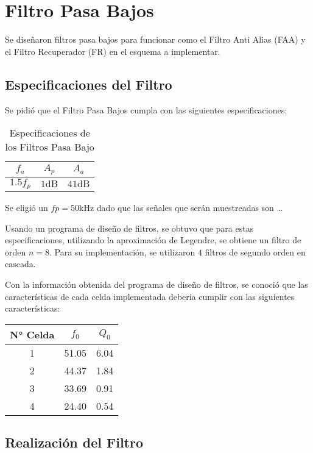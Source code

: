\chapter{Filtro Pasa Bajos}
Se diseñaron filtros pasa bajos para funcionar como el Filtro Anti Alias (FAA) y el Filtro Recuperador (FR) en el esquema a implementar.
\section{Especificaciones del Filtro}
Se pidió que el Filtro Pasa Bajos cumpla con las siguientes especificaciones:

\begin{table}[ht]
    \centering
    \begin{tabular}{|c|c|c|}
        \hline
        $f_a$  &   $A_p$   &   $A_a$    \\
        \hline
        $1.5 f_p$   &   $1 \si{\deci\bel}$ &   $41 \si{\deci\bel}$    \\
        \hline
    \end{tabular}
    \caption{Especificaciones de los Filtros Pasa Bajo}
\end{table}

Se eligió un $fp = 50 \si{\kilo\hertz}$ dado que las señales que serán muestreadas son \dots

Usando un programa de diseño de filtros, se obtuvo que para estas especificaciones, utilizando la aproximación de Legendre, se obtiene un filtro de orden $n=8$. Para su implementación, se utilizaron $4$ filtros de segundo orden en cascada.

Con la información obtenida del programa de diseño de filtros, se conoció que las características de cada celda implementada debería cumplir con las siguientes características:

\begin{table}[ht]
    \centering
    \begin{tabular}{|c|c|c|}
        \hline
        N° Celda    & $f_0$ & $Q_0$ \\
        \hline
        1   & 51.05 & 6.04  \\
        2   & 44.37 & 1.84  \\
        3   & 33.69 & 0.91  \\
        4   & 24.40 & 0.54  \\
        \hline
    \end{tabular}
\end{table}

\section{Realización del Filtro}

